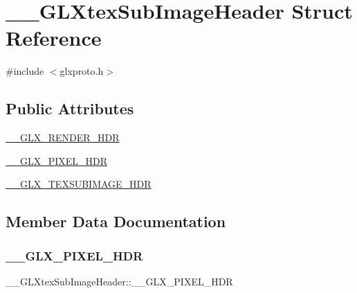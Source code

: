 \hypertarget{struct_____g_l_xtex_sub_image_header}{}\section{\+\_\+\+\_\+\+G\+L\+Xtex\+Sub\+Image\+Header Struct Reference}
\label{struct_____g_l_xtex_sub_image_header}


{\ttfamily \#include $<$glxproto.\+h$>$}

\subsection*{Public Attributes}
\begin{DoxyCompactItemize}
\item 
\hyperlink{struct_____g_l_xtex_sub_image_header_a6ee4cc75d32b24e64f9e5e9153342423}{\+\_\+\+\_\+\+G\+L\+X\+\_\+\+R\+E\+N\+D\+E\+R\+\_\+\+H\+DR}
\item 
\hyperlink{struct_____g_l_xtex_sub_image_header_a3d61e22bea8903e7cb7bd590d3405912}{\+\_\+\+\_\+\+G\+L\+X\+\_\+\+P\+I\+X\+E\+L\+\_\+\+H\+DR}
\item 
\hyperlink{struct_____g_l_xtex_sub_image_header_a7813553d3535ea5356b8464f6251d6dc}{\+\_\+\+\_\+\+G\+L\+X\+\_\+\+T\+E\+X\+S\+U\+B\+I\+M\+A\+G\+E\+\_\+\+H\+DR}
\end{DoxyCompactItemize}


\subsection{Member Data Documentation}
\mbox{\label{struct_____g_l_xtex_sub_image_header_a3d61e22bea8903e7cb7bd590d3405912}} 
\subsubsection{\texorpdfstring{\+\_\+\+\_\+\+G\+L\+X\+\_\+\+P\+I\+X\+E\+L\+\_\+\+H\+DR}{\_\_GLX\_PIXEL\_HDR}}
{\footnotesize\ttfamily \+\_\+\+\_\+\+G\+L\+Xtex\+Sub\+Image\+Header\+::\+\_\+\+\_\+\+G\+L\+X\+\_\+\+P\+I\+X\+E\+L\+\_\+\+H\+DR}

